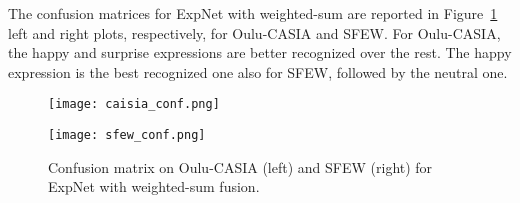 \documentclass{bmvc2k}
\begin{document}
The confusion matrices for ExpNet with weighted-sum are reported in Figure~\ref{fig:sfew_conf} left and right plots, respectively, for Oulu-CASIA and SFEW. For Oulu-CASIA, the happy and surprise expressions are better recognized over the rest. The happy expression is the best recognized one also for SFEW, followed by the neutral one. 

\begin{figure}[!ht]
\centering
\begin{minipage}{0.4\linewidth}
\centering
\texttt{[image: caisia\_conf.png]}
\end{minipage}
\begin{minipage}{0.4\linewidth}
\centering
\texttt{[image: sfew\_conf.png]}
\end{minipage}
\caption{Confusion matrix on Oulu-CASIA (left) and SFEW (right) for ExpNet with weighted-sum fusion.}
\label{fig:sfew_conf}
\end{figure}
\setlength{\tabcolsep}{4pt}
\end{document}
